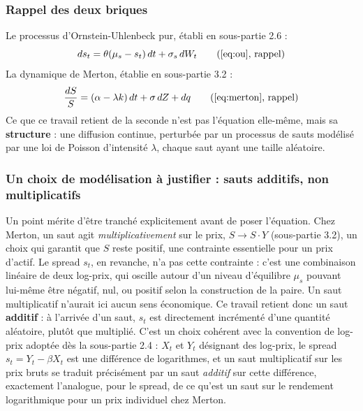 \documentclass{article}
\begin{document}
\subsubsection*{Rappel des deux briques}
Le processus d'Ornstein-Uhlenbeck pur, établi en sous-partie 2.6 :
\begin{equation}
ds_t = \theta(\mu_s-s_t)\,dt + \sigma_s\,dW_t \tag{\ref{eq:ou}, rappel}
\end{equation}
La dynamique de Merton, établie en sous-partie 3.2 :
\begin{equation}
\frac{dS}{S} = (\alpha-\lambda k)\,dt + \sigma\,dZ + dq \tag{\ref{eq:merton}, rappel}
\end{equation}
Ce que ce travail retient de la seconde n'est pas l'équation elle-même, mais sa \textbf{structure} : une diffusion continue, perturbée par un processus de sauts modélisé par une loi de Poisson d'intensité $\lambda$, chaque saut ayant une taille aléatoire.
\subsubsection*{Un choix de modélisation à justifier : sauts additifs, non multiplicatifs}
Un point mérite d'être tranché explicitement avant de poser l'équation. Chez Merton, un saut agit \emph{multiplicativement} sur le prix, $S \to S\cdot Y$ (sous-partie 3.2), un choix qui garantit que $S$ reste positif, une contrainte essentielle pour un prix d'actif. Le spread $s_t$, en revanche, n'a pas cette contrainte : c'est une combinaison linéaire de deux log-prix, qui oscille autour d'un niveau d'équilibre $\mu_s$ pouvant lui-même être négatif, nul, ou positif selon la construction de la paire. Un saut multiplicatif n'aurait ici aucun sens économique.
Ce travail retient donc un saut \textbf{additif} : à l'arrivée d'un saut, $s_t$ est directement incrémenté d'une quantité aléatoire, plutôt que multiplié. C'est un choix cohérent avec la convention de log-prix adoptée dès la sous-partie 2.4 : $X_t$ et $Y_t$ désignant des log-prix, le spread $s_t = Y_t-\beta X_t$ est une différence de logarithmes, et un saut multiplicatif sur les prix bruts se traduit précisément par un saut \emph{additif} sur cette différence, exactement l'analogue, pour le spread, de ce qu'est un saut sur le rendement logarithmique pour un prix individuel chez Merton.
\end{document}
